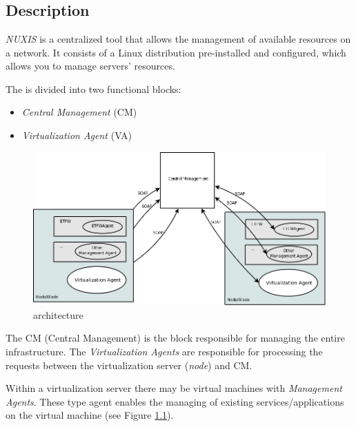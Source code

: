 \chapter{\textsf{\acronym}}
\section*{Description}
\emph{NUXIS} is a centralized tool that allows the management of available resources on a network. It consists of a Linux distribution pre-installed and configured, which allows you to manage servers' resources.

The \acronym is divided into two functional blocks:

\begin{itemize}
	\item \emph{Central Management} (CM)
    \item \emph{Virtualization Agent} (VA)
\end{itemize}

\begin{figure}[H]
	\begin{center}
	\includegraphics[scale=0.35]{screenshots/etva_blocos.png}
	\caption{\acronym architecture}
	\label{fig:etva_blocos}
	\end{center}
\end{figure}

The CM (Central Management) is the block responsible for managing the entire infrastructure.
The \emph{Virtualization Agents} are responsible for processing the requests between the virtualization server (\emph{node}) and CM.

Within a virtualization server there may be virtual machines with \emph{Management Agents}. These type agent enables the managing of existing services/applications on the virtual machine (see Figure \ref{fig:etva_blocos}).

